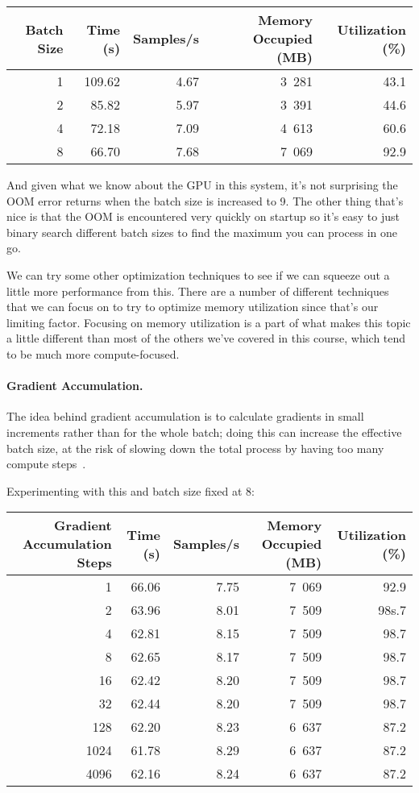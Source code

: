 \begin{center}
\begin{tabular}{r|r|r|r|r}
\textbf{Batch Size} & \textbf{Time (s)} & \textbf{Samples/s} & \textbf{Memory Occupied (MB)} & \textbf{Utilization (\%)} \\ \hline
1 & 109.62 & 4.67 & 3~281 & 43.1 \\
2 & 85.82 & 5.97 & 3~391 & 44.6 \\
4 & 72.18 & 7.09 & 4~613 & 60.6 \\
8 & 66.70 & 7.68 & 7~069 & 92.9 \\
\end{tabular}
\end{center}

And given what we know about the GPU in this system, it's not surprising the OOM error returns when the batch size is increased to 9. The other thing that's nice is that the OOM is encountered very quickly on startup so it's easy to just binary search different batch sizes to find the maximum you can process in one go. 

We can try some other optimization techniques to see if we can squeeze out a little more performance from this. There are a number of different techniques that we can focus on to try to optimize memory utilization since that's our limiting factor. Focusing on memory utilization is a part of what makes this topic a little different than most of the others we've covered in this course, which tend to be much more compute-focused. 

\paragraph{Gradient Accumulation.} The idea behind gradient accumulation is to calculate gradients in small increments rather than for the whole batch; doing this can increase the effective batch size, at the risk of slowing down the total process by having too many compute steps~\cite{hf}.

Experimenting with this and batch size fixed at 8:

\begin{center}
\begin{tabular}{r|r|r|r|r}
\textbf{Gradient Accumulation Steps} & \textbf{Time (s)} & \textbf{Samples/s} & \textbf{Memory Occupied (MB)} & \textbf{Utilization (\%)} \\ \hline
1 & 66.06 & 7.75 & 7~069 & 92.9 \\
2 & 63.96 & 8.01 & 7~509 & 98s.7 \\
4 & 62.81 & 8.15 & 7~509 & 98.7 \\
8 & 62.65 & 8.17 & 7~509 & 98.7 \\
16 & 62.42 & 8.20 & 7~509 & 98.7 \\
32 & 62.44 & 8.20 & 7~509 & 98.7\\
128 & 62.20 & 8.23 & 6~637 & 87.2\\
1024 & 61.78 & 8.29 & 6~637 & 87.2 \\
4096 & 62.16 & 8.24 & 6~637 & 87.2
\end{tabular}
\end{center}

